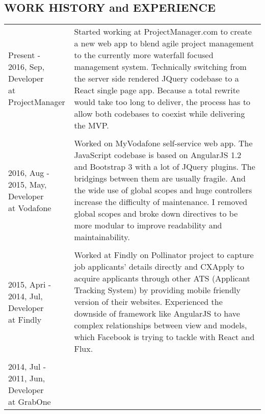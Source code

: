\begin{resume}
\section{WORK HISTORY and EXPERIENCE} 
\vspace{0.15in} 

\begin{tabular}{ll}
\parbox[t]{30mm}{Present - \\ 2016, Sep,\\Developer\\at ProjectManager} & \parbox[t]{116mm}{

Started working at ProjectManager.com to create a new web app to blend agile project management to the currently more waterfall focused management system. Technically switching from the server side rendered JQuery codebase to a React single page app. Because a total rewrite would take too long to deliver, the process has to allow both codebases to coexist while delivering the MVP.

}\\\\
\parbox[t]{30mm}{2016, Aug - \\ 2015, May,\\Developer\\at Vodafone} & \parbox[t]{116mm}{

Worked on MyVodafone self-service web app. The JavaScript codebase is based on AngularJS 1.2 and Bootstrap 3 with a lot of JQuery plugins. The bridgings between them are usually fragile. And the wide use of global scopes and huge controllers increase the difficulty of maintenance. I removed global scopes and broke down directives to be more modular to improve readability and maintainability. 

}\\\\
\parbox[t]{30mm}{2015, Apri - \\ 2014, Jul,\\Developer\\at Findly} & \parbox[t]{116mm}{

Worked at Findly on Pollinator project to capture job applicants' details directly and CXApply to acquire applicants through other ATS (Applicant Tracking System) by providing mobile friendly version of their websites. Experienced the downside of framework like AngularJS to have complex relationships between view and models, which Facebook is trying to tackle with React and Flux.

}\\\\
\parbox[t]{30mm}{2014, Jul - \\ 2011, Jun,\\Developer\\at GrabOne} & \parbox[t]{116mm}{

}
\end{tabular}
\end{resume}
